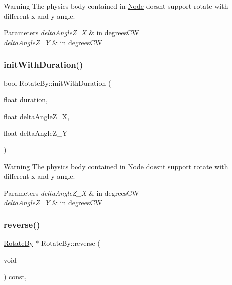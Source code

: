 \begin{DoxyWarning}{Warning}
The physics body contained in \hyperlink{classNode}{Node} doesn\textquotesingle{}t support rotate with different x and y angle. 
\end{DoxyWarning}

\begin{DoxyParams}{Parameters}
{\em delta\+Angle\+Z\+\_\+X} & in degrees\+CW \\
\hline
{\em delta\+Angle\+Z\+\_\+Y} & in degrees\+CW \\
\hline
\end{DoxyParams}
\mbox{\label{classRotateBy_a68722de21a44b6efa8b85654c7ebd69c}} 
\subsubsection{\texorpdfstring{init\+With\+Duration()}{initWithDuration()}\hspace{0.1cm}{\footnotesize\ttfamily [4/4]}}
{\footnotesize\ttfamily bool Rotate\+By\+::init\+With\+Duration (\begin{DoxyParamCaption}\item[{float}]{duration,  }\item[{float}]{delta\+Angle\+Z\+\_\+X,  }\item[{float}]{delta\+Angle\+Z\+\_\+Y }\end{DoxyParamCaption})}

\begin{DoxyWarning}{Warning}
The physics body contained in \hyperlink{classNode}{Node} doesn\textquotesingle{}t support rotate with different x and y angle. 
\end{DoxyWarning}

\begin{DoxyParams}{Parameters}
{\em delta\+Angle\+Z\+\_\+X} & in degrees\+CW \\
\hline
{\em delta\+Angle\+Z\+\_\+Y} & in degrees\+CW \\
\hline
\end{DoxyParams}
\mbox{\label{classRotateBy_a3aab93d46d83679a5ce4b51a9a554031}} 
\subsubsection{\texorpdfstring{reverse()}{reverse()}\hspace{0.1cm}{\footnotesize\ttfamily [1/2]}}
{\footnotesize\ttfamily \hyperlink{classRotateBy}{Rotate\+By} $\ast$ Rotate\+By\+::reverse (\begin{DoxyParamCaption}\item[{void}]{ }\end{DoxyParamCaption}) const\hspace{0.3cm}{\ttfamily [override]}, {\ttfamily [virtual]}}

